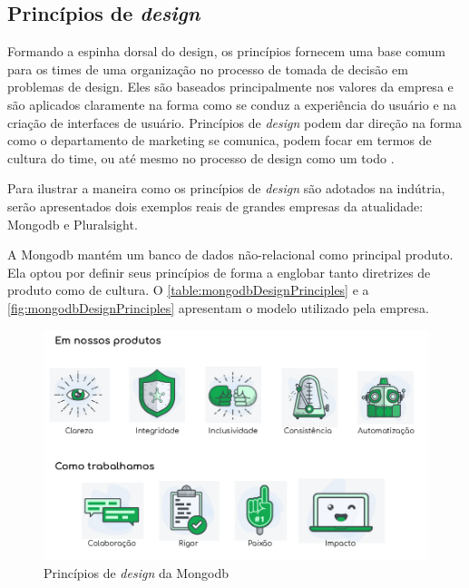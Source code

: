\subsection{Princípios de \textit{design}}

Formando a espinha dorsal do design, os princípios fornecem uma base comum para os times de uma organização no processo de tomada de decisão em problemas de design. Eles são baseados principalmente nos valores da empresa e são aplicados claramente na forma como se conduz a experiência do usuário e na criação de interfaces de usuário. Princípios de \textit{design} podem dar direção na forma como o departamento de marketing se comunica, podem focar em termos de cultura do time, ou até mesmo no processo de design como um todo \cite{kholmatova2017design}.

Para ilustrar a maneira como os princípios de \textit{design} são adotados na indútria, serão apresentados dois exemplos reais de grandes empresas da atualidade: Mongodb e Pluralsight.

A Mongodb mantém um banco de dados não-relacional como principal produto. Ela optou por definir seus princípios de forma a englobar tanto diretrizes de produto como de cultura. O \autoref{table:mongodbDesignPrinciples} e a \autoref{fig:mongodbDesignPrinciples} apresentam o modelo utilizado pela empresa.


\begin{figure}[!htb]
	\centering
	\includegraphics[width=\linewidth]{./04-figuras/02_referencial_teorico/mongodb-design-principles.png}
	\caption{Princípios de \textit{design} da Mongodb}
  \label{fig:mongodbDesignPrinciples}
\end{figure}

